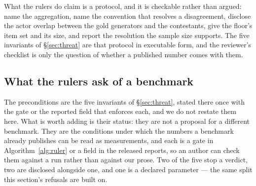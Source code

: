 \documentclass{article}
\begin{document}
What the rulers do claim is a protocol, and it is checkable rather than argued: name the aggregation, name the convention that resolves a disagreement, disclose the actor overlap between the gold generators and the contestants, give the floor's item set and its size, and report the resolution the sample size supports. The five invariants of \S\ref{sec:threat} are that protocol in executable form, and the reviewer's checklist is only the question of whether a published number comes with them.

\subsection{What the rulers ask of a benchmark}
\label{sec:asks} The preconditions are the five invariants of \S\ref{sec:threat}, stated there once with the gate or the reported field that enforces each, and we do not restate them here. What is worth adding is their status: they are not a proposal for a different benchmark. They are the conditions under which the numbers a benchmark already publishes can be read as measurements, and each is a gate in Algorithm~\ref{alg:ruler} or a field in the released reports, so an author can check them against a run rather than against our prose. Two of the five stop a verdict, two are disclosed alongside one, and one is a declared parameter --- the same split this section's refusals are built on.
\end{document}
